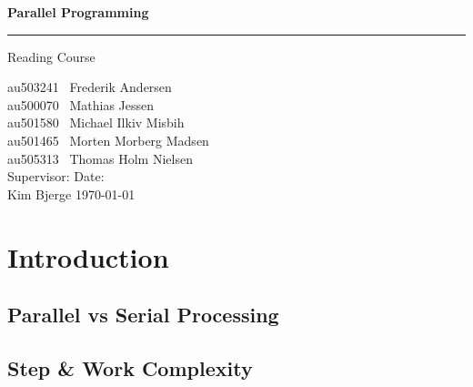 \documentclass[12px,oz]{report}
\theoremstyle{indented}
\theoremstyle{indented}
\begin{document}
	
	\begin{titlepage}
		\centering
		\vspace*{3\baselineskip}
		{\Huge \bfseries Parallel Programming}
		\rule{\linewidth}{0.5mm}
		\LARGE
		Reading Course
		\\
		\null\vfill
		\begin{flushleft} \large
			au503241 \hspace*{2em} \  Frederik Andersen\\
			au500070 \hspace*{2em} \  Mathias Jessen\\
			au501580 \hspace*{2em} \  Michael Ilkiv Misbih\\
			au501465 \hspace*{2em} \  Morten Morberg Madsen\\
			au505313 \hspace*{2em} \  Thomas Holm Nielsen\\
			\vspace{100pt}
			Supervisor:\hspace{94pt}  Date: \\
			Kim Bjerge \hspace{90pt}  \today\\
		\end{flushleft}
		\vspace*{6\baselineskip}
	\end{titlepage}

\tableofcontents
\clearpage
{}
\cleardoublepage

\chapter{Introduction}
\label{ch-intro}


 
 	\section{Parallel vs Serial Processing}
	\label{sec-par-vs-ser}
	

	\section{Step \& Work Complexity}
	\label{sec-step-comp}
	
\end{document}
